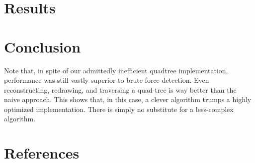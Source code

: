     \section{Results}

    \section{Conclusion}
	Note that, in spite of our admittedly inefficient quadtree
	implementation, performance was still vastly superior to brute
	force detection.  Even reconstructing, redrawing, and traversing
	a quad-tree is way better than the naive approach. This shows
	that, in this case, a clever algorithm trumps a highly optimized
	implementation. There is simply no substitute for a less-complex
	algorithm.

    \section{References}
      
      






